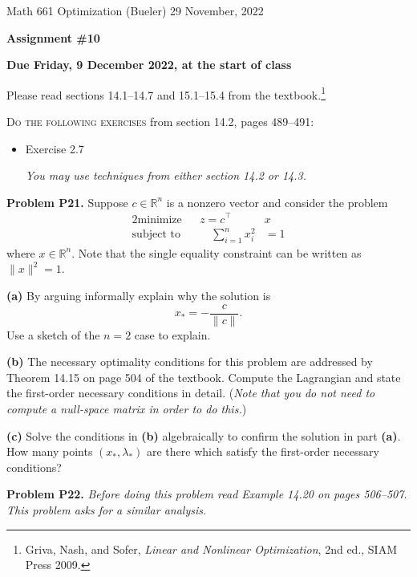 \documentclass[12pt]{amsart}
\newcommand{\RR}{\mathbb{R}}
\newcommand{\prob}[1]{\bigskip\noindent\textbf{#1}\quad }
\newcommand{\epart}[1]{\medskip\noindent\textbf{(#1)}\quad }
\begin{document}
\scriptsize \noindent Math 661 Optimization (Bueler) \hfill 29 November, 2022
\normalsize

\medskip\bigskip

\Large\centerline{\textbf{Assignment \#10}}
\large
\bigskip

\centerline{\textbf{Due Friday, 9 December 2022, at the start of class}}
\bigskip
\normalsize

\thispagestyle{empty}

\bigskip
Please read sections 14.1--14.7 and 15.1--15.4 from the textbook.\footnote{Griva, Nash, and Sofer, \emph{Linear and Nonlinear Optimization}, 2nd ed., SIAM Press 2009.}

\bigskip
\noindent \textsc{Do the following exercises} from section 14.2, pages 489--491:

\begin{itemize}
\item Exercise 2.7 \quad \begin{minipage}[t]{4.5in} \emph{You may use techniques from \emph{either} section 14.2 or 14.3.} \end{minipage}
\end{itemize}

\medskip
\prob{Problem P21.} Suppose $c\in\RR^n$ is a nonzero vector and consider the problem
\begin{alignat*}{2}
    \text{minimize}   &&  z = c^\top &x \\
    \text{subject to} && \quad \sum_{i=1}^n x_i^2 &= 1
\end{alignat*}
where $x\in\RR^n$.  Note that the single equality constraint can be written as $\|x\|^2=1$.

\epart{a}  By arguing informally explain why the solution is
    $$x_* = - \frac{c}{\|c\|}.$$
Use a sketch of the $n=2$ case to explain.

\epart{b}  The necessary optimality conditions for this problem are addressed by Theorem 14.15 on page 504 of the textbook.  Compute the Lagrangian and state the first-order necessary conditions in detail.  (\emph{Note that you do \emph{not} need to compute a null-space matrix in order to do this.})

\epart{c}  Solve the conditions in \textbf{(b)} algebraically to confirm the solution in part \textbf{(a)}.  How many points $(x_*,\lambda_*)$ are there which satisfy the first-order necessary conditions?


\medskip
\prob{Problem P22.}  \emph{Before doing this problem read Example 14.20 on pages 506--507.  This problem asks for a similar analysis.}
\end{document}
